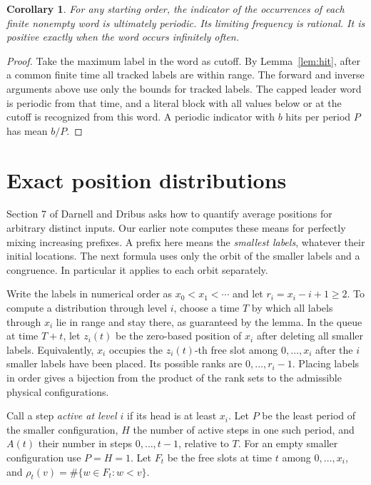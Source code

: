 \documentclass[11pt]{article}
\newtheorem{corollary}[theorem]{Corollary}
\begin{document}
\begin{corollary}\label{cor:blocks}
For any starting order, the indicator of the occurrences of each finite nonempty word
is ultimately periodic. Its limiting frequency is rational. It is positive exactly when
the word occurs infinitely often.
\end{corollary}
\begin{proof}
Take the maximum label in the word as cutoff. By Lemma~\ref{lem:hit}, after a common finite
time all tracked labels are within range. The forward and inverse arguments above use only
the bounds for tracked labels. The capped leader word is periodic from that time, and a
literal block with all values below or at the cutoff is recognized from this word.
A periodic indicator with $b$ hits per period $P$ has mean $b/P$.
\end{proof}

\section{Exact position distributions}
Section 7 of Darnell and Dribus \cite{dd} asks how to quantify average positions for
arbitrary distinct inputs. Our earlier note \cite{mix} computes these means for perfectly
mixing increasing prefixes. A prefix here means the \emph{smallest labels}, whatever their
initial locations. The next formula uses only the orbit of the smaller labels and a
congruence. In particular it applies to each orbit separately.

Write the labels in numerical order as $x_0<x_1<\cdots$ and let $r_i=x_i-i+1\ge2$.
To compute a distribution through level $i$, choose a time $T$ by which all labels through
$x_i$ lie in range and stay there, as guaranteed by the lemma. In the queue at time $T+t$,
let $z_i(t)$ be the zero-based position of $x_i$ after deleting all smaller labels.
Equivalently, $x_i$ occupies the $z_i(t)$-th free slot among $0,\dots,x_i$ after the
$i$ smaller labels have been placed. Its possible ranks are $0,\dots,r_i-1$.
Placing labels in order gives a bijection from the product of the rank sets to the
admissible physical configurations.

Call a step \emph{active at level $i$} if its head is at least $x_i$.
Let $P$ be the least period of the smaller configuration, $H$ the number of active steps
in one such period, and $A(t)$ their number in steps $0,\ldots,t-1$, relative to $T$.
For an empty smaller configuration use $P=H=1$. Let $F_t$ be the free slots at time $t$
among $0,\ldots,x_i$, and $\rho_t(v)=\#\{w\in F_t:w<v\}$.
\end{document}
